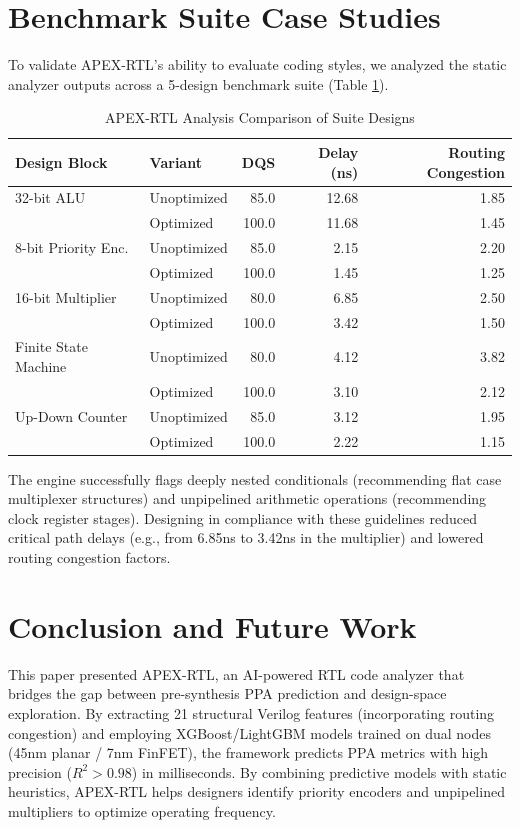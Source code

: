 \documentclass[conference]{IEEEtran}
\begin{document}
\section{Benchmark Suite Case Studies}
To validate APEX-RTL's ability to evaluate coding styles, we analyzed the static analyzer outputs across a 5-design benchmark suite (Table \ref{tab:comparison}).

\begin{table}[h]
\centering
\caption{APEX-RTL Analysis Comparison of Suite Designs}
\label{tab:comparison}
\begin{tabular}{llrrr}
\toprule
\textbf{Design Block} & \textbf{Variant} & \textbf{DQS} & \textbf{Delay (ns)} & \textbf{Routing Congestion} \\
\midrule
32-bit ALU            & Unoptimized & 85.0 & 12.68 & 1.85 \\
                      & Optimized   & 100.0 & 11.68 & 1.45 \\
\midrule
8-bit Priority Enc.   & Unoptimized & 85.0 & 2.15 & 2.20 \\
                      & Optimized   & 100.0 & 1.45 & 1.25 \\
\midrule
16-bit Multiplier     & Unoptimized & 80.0 & 6.85 & 2.50 \\
                      & Optimized   & 100.0 & 3.42 & 1.50 \\
\midrule
Finite State Machine  & Unoptimized & 80.0 & 4.12 & 3.82 \\
                      & Optimized   & 100.0 & 3.10 & 2.12 \\
\midrule
Up-Down Counter       & Unoptimized & 85.0 & 3.12 & 1.95 \\
                      & Optimized   & 100.0 & 2.22 & 1.15 \\
\bottomrule
\end{tabular}
\end{table}

The engine successfully flags deeply nested conditionals (recommending flat case multiplexer structures) and unpipelined arithmetic operations (recommending clock register stages). Designing in compliance with these guidelines reduced critical path delays (e.g., from 6.85ns to 3.42ns in the multiplier) and lowered routing congestion factors.

\section{Conclusion and Future Work}
This paper presented APEX-RTL, an AI-powered RTL code analyzer that bridges the gap between pre-synthesis PPA prediction and design-space exploration. By extracting 21 structural Verilog features (incorporating routing congestion) and employing XGBoost/LightGBM models trained on dual nodes (45nm planar / 7nm FinFET), the framework predicts PPA metrics with high precision ($R^2 > 0.98$) in milliseconds. By combining predictive models with static heuristics, APEX-RTL helps designers identify priority encoders and unpipelined multipliers to optimize operating frequency.
\end{document}
